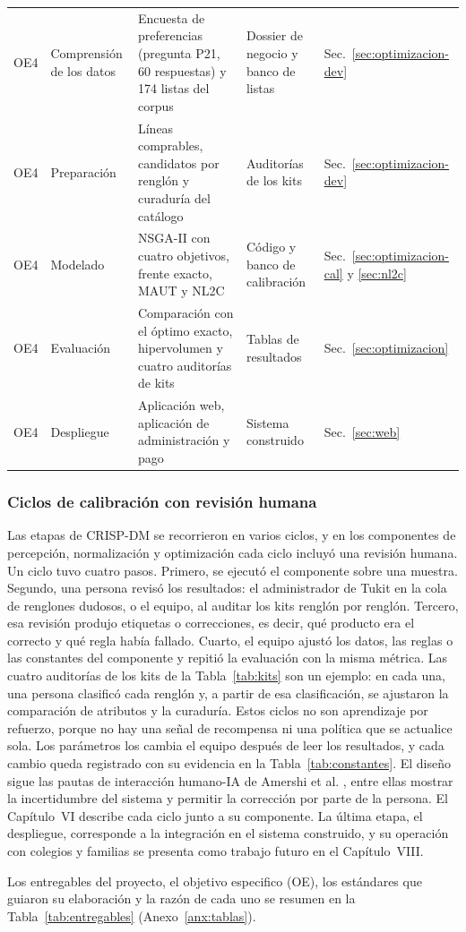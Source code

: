 \begin{table}[H]
\begin{tabularx}{\textwidth}{@{}p{0.9cm}p{2.4cm}XXp{1.9cm}@{}}
\midrule
OE4 & Comprensión de los datos & Encuesta de preferencias (pregunta P21, 60 respuestas) y 174
listas del corpus & Dossier de negocio y banco de listas & Sec.~\ref{sec:optimizacion-dev} \\
OE4 & Preparación & Líneas comprables, candidatos por renglón y curaduría del catálogo &
Auditorías de los kits & Sec.~\ref{sec:optimizacion-dev} \\
OE4 & Modelado & NSGA-II con cuatro objetivos, frente exacto, MAUT y NL2C &
Código y banco de calibración & Sec.~\ref{sec:optimizacion-cal} y \ref{sec:nl2c} \\
OE4 & Evaluación & Comparación con el óptimo exacto, hipervolumen y cuatro auditorías de kits &
Tablas de resultados & Sec.~\ref{sec:optimizacion} \\
OE4 & Despliegue & Aplicación web, aplicación de administración y pago & Sistema
construido & Sec.~\ref{sec:web} \\
\bottomrule
\end{tabularx}
\end{table}

\subsubsection{Ciclos de calibración con revisión humana}
\label{sec:ciclos-calibracion}

Las etapas de CRISP-DM se recorrieron en varios ciclos, y en los componentes de percepción,
normalización y optimización cada ciclo incluyó una revisión humana. Un ciclo tuvo cuatro pasos.
Primero, se ejecutó el componente sobre una muestra. Segundo, una persona revisó los resultados:
el administrador de Tukit en la cola de renglones dudosos, o el equipo, al auditar los kits renglón
por renglón. Tercero, esa revisión produjo etiquetas o correcciones, es decir, qué producto era el
correcto y qué regla había fallado. Cuarto, el equipo ajustó los datos, las reglas o las constantes
del componente y repitió la evaluación con la misma métrica. Las cuatro auditorías de los kits de la
Tabla~\ref{tab:kits} son un ejemplo: en cada una, una persona clasificó cada renglón y, a partir de
esa clasificación, se ajustaron la comparación de atributos y la curaduría. Estos ciclos no son
aprendizaje por refuerzo, porque no hay una señal de recompensa ni una política que se actualice
sola. Los parámetros los cambia el equipo después de leer los resultados, y cada cambio queda
registrado con su evidencia en la Tabla~\ref{tab:constantes}. El diseño sigue las pautas de
interacción humano-IA de Amershi et al. \citep{amershi_guidelines_2019}, entre ellas mostrar
la incertidumbre del sistema y permitir la corrección por parte de la persona. El Capítulo~VI
describe cada ciclo junto a su componente. La última etapa, el despliegue, corresponde a la
integración en el sistema construido, y su operación con colegios y familias se presenta como
trabajo futuro en el Capítulo~VIII.

Los entregables del proyecto, el objetivo especifico (OE), los estándares que guiaron su elaboración y la razón de cada
uno se resumen en la Tabla~\ref{tab:entregables} (Anexo~\ref{anx:tablas}).

